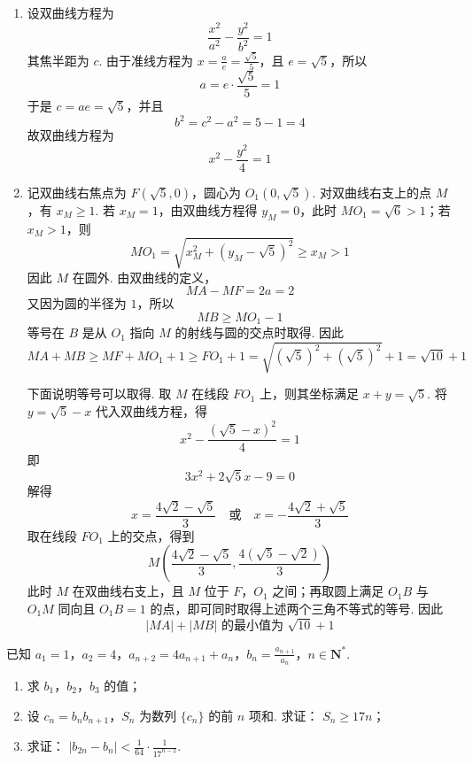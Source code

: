 \begin{solution}
\begin{enumerate}
\item 设双曲线方程为
\[
\frac{x^2}{a^2}-\frac{y^2}{b^2}=1
\]
其焦半距为 \(c\). 由于准线方程为 \(x=\frac ae=\frac{\sqrt5}{5}\)，且 \(e=\sqrt5\)，所以
\[
a=e\cdot\frac{\sqrt5}{5}=1
\]
于是 \(c=ae=\sqrt5\)，并且
\[
b^2=c^2-a^2=5-1=4
\]
故双曲线方程为
\[
x^2-\frac{y^2}{4}=1
\]

\item 记双曲线右焦点为 \(F(\sqrt5,0)\)，圆心为 \(O_1(0,\sqrt5)\). 对双曲线右支上的点 \(M\)，有 \(x_M\geqslant1\). 若 \(x_M=1\)，由双曲线方程得 \(y_M=0\)，此时 \(MO_1=\sqrt6>1\)；若 \(x_M>1\)，则
\[
MO_1=\sqrt{x_M^2+(y_M-\sqrt5)^2}\geqslant x_M>1
\]
因此 \(M\) 在圆外. 由双曲线的定义，
\[
MA-MF=2a=2
\]
又因为圆的半径为 \(1\)，所以
\[
MB\geqslant MO_1-1
\]
等号在 \(B\) 是从 \(O_1\) 指向 \(M\) 的射线与圆的交点时取得. 因此
\[
MA+MB\geqslant MF+MO_1+1\geqslant FO_1+1=\sqrt{(\sqrt5)^2+(\sqrt5)^2}+1=\sqrt{10}+1
\]

下面说明等号可以取得. 取 \(M\) 在线段 \(FO_1\) 上，则其坐标满足 \(x+y=\sqrt5\). 将 \(y=\sqrt5-x\) 代入双曲线方程，得
\[
x^2-\frac{(\sqrt5-x)^2}{4}=1
\]
即
\[
3x^2+2\sqrt5x-9=0
\]
解得
\[
x=\frac{4\sqrt2-\sqrt5}{3}\quad\text{或}\quad x=-\frac{4\sqrt2+\sqrt5}{3}
\]
取在线段 \(FO_1\) 上的交点，得到
\[
M\left(\frac{4\sqrt2-\sqrt5}{3},\frac{4(\sqrt5-\sqrt2)}{3}\right)
\]
此时 \(M\) 在双曲线右支上，且 \(M\) 位于 \(F\)，\(O_1\) 之间；再取圆上满足 \(O_1B\) 与 \(O_1M\) 同向且 \(O_1B=1\) 的点，即可同时取得上述两个三角不等式的等号. 因此
\[
|MA|+|MB|\text{ 的最小值为 }\sqrt{10}+1
\]
\end{enumerate}
\end{solution}

\begin{problem}
已知 \(a_1 = 1\)，\(a_2 = 4\)，\(a_{n+2} = 4a_{n+1} + a_n\)，\(b_n = \frac{a_{n+1}}{a_n}\)，\(n \in \mathbf{N}^*\).
\begin{enumerate}
\item 求 \(b_{1}\)，\(b_{2}\)，\(b_{3}\) 的值；
\item 设 \(c_{n} = b_{n}b_{n + 1}\)，\(S_{n}\) 为数列 \(\{c_n\}\) 的前 \(n\) 项和. 求证： \(S_{n} \geqslant 17n\)；
\item 求证： \( |b_{2n} - b_n| < \frac{1}{64} \cdot \frac{1}{17^{n-2}} \).
\end{enumerate}
\end{problem}

